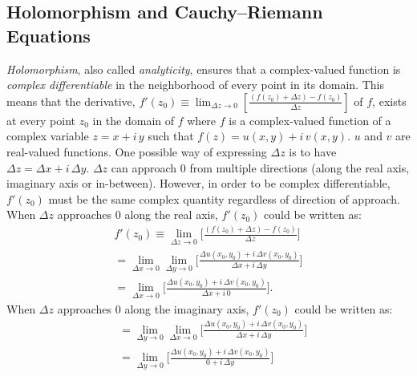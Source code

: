 \documentclass{article}
\begin{document}
\subsection{Holomorphism and Cauchy–Riemann Equations}\label{appendixholomorphism}

\textit{Holomorphism}, also called \textit{analyticity}, ensures that a complex-valued function is \textit{complex differentiable} in the neighborhood of every point in its domain. This means that the derivative, $f'(z_{0}) \equiv \lim_{\Delta z \to 0} [\frac{(f(z_{0}) + \Delta z) - f(z_{0})}{\Delta z}]$ of $f$, exists at every point $z_{0}$ in the domain of $f$ where $f$ is a complex-valued function of a complex variable $z = x + i \, y$ such that $f(z) = u(x, y) + i \, v(x, y)$. $u$ and $v$ are real-valued functions. One possible way of expressing $\Delta z$ is to have $\Delta z = \Delta x + i \, \Delta y$. $\Delta z$ can approach $0$ from multiple directions (along the real axis, imaginary axis or in-between). However, in order to be complex differentiable, $f'(z_{0})$ must be the same complex quantity regardless of direction of approach. When $\Delta z$ approaches $0$ along the real axis, $f'(z_{0})$ could be written as:
\begin{equation}\label{complex_derivative_along_real}
\begin{aligned}
f'(z_{0}) \equiv \lim_{\Delta z \to 0} \bigg[\frac{(f(z_{0}) + \Delta z) - f(z_{0})}{\Delta z} \bigg] \\ =\lim_{\Delta x \to 0} \lim_{\Delta y \to 0}\bigg[\frac{\Delta u(x_{0}, y_{0}) + i \, \Delta v(x_{0}, y_{0})}{\Delta x + i \, \Delta y} \bigg] \\ = \lim_{\Delta x \to 0} \bigg[\frac{\Delta u(x_{0}, y_{0}) + i \, \Delta v(x_{0}, y_{0})}{\Delta x + i \, 0} \bigg].
\end{aligned}
\end{equation}
When $\Delta z$ approaches $0$ along the imaginary axis, $f'(z_{0})$ could be written as:
\begin{equation}\label{complex_derivative_along_imag}
\begin{aligned}
& = \lim_{\Delta y \to 0} \lim_{\Delta x \to 0}\bigg[\frac{\Delta u(x_{0}, y_{0}) + i \, \Delta v(x_{0}, y_{0})}{\Delta x + i \, \Delta y} \bigg] \\ & = \lim_{\Delta y \to 0} \bigg[\frac{\Delta u(x_{0}, y_{0}) + i \, \Delta v(x_{0}, y_{0})}{0 + i \, \Delta y} \bigg]
\end{aligned}
\end{equation}
\end{document}
